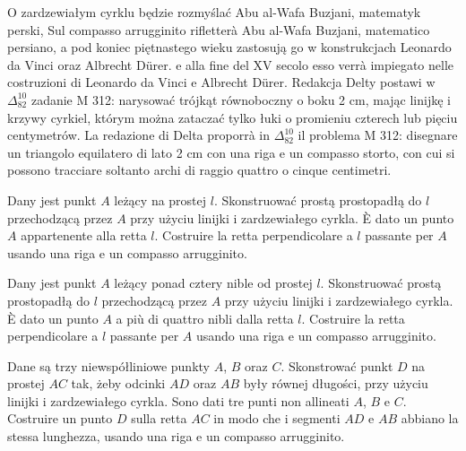 O zardzewiałym cyrklu będzie rozmyślać Abu al-Wafa Buzjani, matematyk perski, %
Sul compasso arrugginito rifletterà Abu al-Wafa Buzjani, matematico persiano, %
%
a pod koniec piętnastego wieku zastosują go w konstrukcjach Leonardo da Vinci oraz Albrecht Dürer. %
e alla fine del XV secolo esso verrà impiegato nelle costruzioni di Leonardo da Vinci e Albrecht Dürer. %
%
%
Redakcja Delty postawi w $\Delta_{82}^{10}$ zadanie M 312: narysować trójkąt równoboczny o boku 2 cm, mając linijkę i krzywy cyrkiel, którym można zataczać tylko łuki o promieniu czterech lub pięciu centymetrów. %
La redazione di Delta proporrà in $\Delta_{82}^{10}$ il problema M 312: disegnare un triangolo equilatero di lato 2 cm con una riga e un compasso storto, con cui si possono tracciare soltanto archi di raggio quattro o cinque centimetri. %

\begin{geoconstruction}
    Dany jest punkt $A$ leżący na prostej $l$. %
    Skonstruować prostą prostopadłą do $l$ przechodzącą przez $A$ przy użyciu linijki i zardzewiałego cyrkla. %
    È dato un punto $A$ appartenente alla retta $l$. %
    Costruire la retta perpendicolare a $l$ passante per $A$ usando una riga e un compasso arrugginito. %
\end{geoconstruction}

\begin{geoconstruction}
    Dany jest punkt $A$ leżący ponad cztery nible od prostej $l$. %
    Skonstruować prostą prostopadłą do $l$ przechodzącą przez $A$ przy użyciu linijki i zardzewiałego cyrkla. %
    È dato un punto $A$ a più di quattro nibli dalla retta $l$. %
    Costruire la retta perpendicolare a $l$ passante per $A$ usando una riga e un compasso arrugginito. %
\end{geoconstruction}

\begin{geoconstruction}
    Dane są trzy niewspółliniowe punkty $A$, $B$ oraz $C$. %
    Skonstrować punkt $D$ na prostej $AC$ tak, żeby odcinki $AD$ oraz $AB$ były równej długości, przy użyciu linijki i zardzewiałego cyrkla. %
    Sono dati tre punti non allineati $A$, $B$ e $C$. %
    Costruire un punto $D$ sulla retta $AC$ in modo che i segmenti $AD$ e $AB$ abbiano la stessa lunghezza, usando una riga e un compasso arrugginito. %
\end{geoconstruction}

